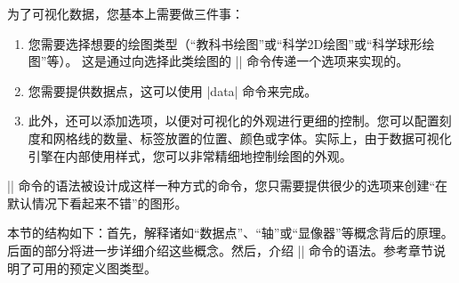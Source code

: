 为了可视化数据，您基本上需要做三件事：
%
\begin{enumerate}
    \item 您需要选择想要的绘图类型（``教科书绘图''或``科学2D绘图''或``科学球形绘图''等）。 这是通过向选择此类绘图的 |\datavisualization| 命令传递一个选项来实现的。
    \item 您需要提供数据点，这可以使用 |data| 命令来完成。
    \item 此外，还可以添加选项，以便对可视化的外观进行更细的控制。您可以配置刻度和网格线的数量、标签放置的位置、颜色或字体。实际上，由于数据可视化引擎在内部使用\tikzname 样式，您可以非常精细地控制绘图的外观。
\end{enumerate}


|\datavisualization| 命令的语法被设计成这样一种方式的命令，您只需要提供很少的选项来创建``在默认情况下看起来不错''的图形。


本节的结构如下：首先，解释诸如``数据点''、``轴''或``显像器''等概念背后的原理。后面的部分将进一步详细介绍这些概念。然后，介绍 |\datavisualization| 命令的语法。参考章节说明了可用的预定义图类型。


